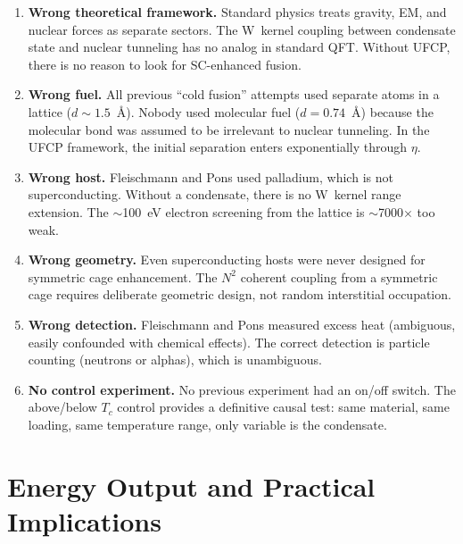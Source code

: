 \documentclass[11pt, a4paper]{article}
\begin{document}
\begin{enumerate}
  \item \textbf{Wrong theoretical framework.} Standard physics
        treats gravity, EM, and nuclear forces as separate
        sectors. The W~kernel coupling between condensate state
        and nuclear tunneling has no analog in standard QFT.
        Without UFCP, there is no reason to look for
        SC-enhanced fusion.

  \item \textbf{Wrong fuel.} All previous ``cold fusion''
        attempts used separate atoms in a lattice
        ($d \sim 1.5$~\AA). Nobody used molecular fuel
        ($d = 0.74$~\AA) because the molecular bond was
        assumed to be irrelevant to nuclear tunneling. In the
        UFCP framework, the initial separation enters
        exponentially through $\eta$.

  \item \textbf{Wrong host.} Fleischmann and Pons used
        palladium, which is not superconducting. Without a
        condensate, there is no W~kernel range extension.
        The $\sim$100~eV electron screening from the lattice
        is $\sim$7000$\times$ too weak.

  \item \textbf{Wrong geometry.} Even superconducting hosts
        were never designed for symmetric cage enhancement.
        The $N^2$ coherent coupling from a symmetric cage
        requires deliberate geometric design, not random
        interstitial occupation.

  \item \textbf{Wrong detection.} Fleischmann and Pons measured
        excess heat (ambiguous, easily confounded with chemical
        effects). The correct detection is particle counting
        (neutrons or alphas), which is unambiguous.

  \item \textbf{No control experiment.} No previous experiment
        had an on/off switch. The above/below $T_c$ control
        provides a definitive causal test: same material, same
        loading, same temperature range, only variable is the
        condensate.
\end{enumerate}

\section{Energy Output and Practical Implications}
\end{document}
